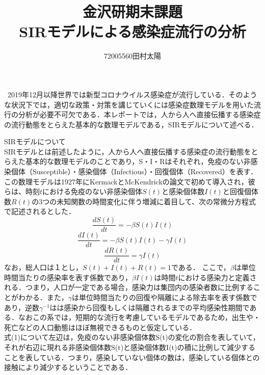\documentclass{jarticle}
\begin{document}
\title{金沢研期末課題\\SIRモデルによる感染症流行の分析}
\author{72005560田村太陽}
\maketitle

\begin{flushleft}\
2019年12月以降世界では新型コロナウイルス感染症が流行している．そのような状況下では，適切な政策・対策を講じていくには感染症数理モデルを用いた流行の分析が必要不可欠である．本レポートでは，人から人へ直接伝播する感染症の流行動態をとらえた基本的な数理モデルである，SIRモデルについて述べる．
\end{flushleft}


SIRモデルについて\\
SIRモデルとは前述したように，人から人へ直接伝播する感染症の流行動態をとらえた基本的な数理モデルのことであり，S・I・Rはそれぞれ，免疫のない非感染個体（Susceptible）・感染個体（Infectious）・回復個体（Recovered）を表す．この数理モデルは1927年にKermackとMcKendrickの論文で初めて導入され，彼らは、時刻$t$における免疫のない非感染個体$S(t)$と感染個体数$I(t)$と回復個体数$R(t)$の3つの未知関数の時間変化に伴う増減に着目して、次の常微分方程式で記述されるとした．\\
\begin{equation}
\frac{dS(t)}{dt} = -\beta S(t)I(t) 
\end{equation}
\begin{equation}
\frac{dI(t)}{dt} = -\beta S(t)I(t)-\gamma I(t)
\end{equation}
\begin{equation}
\frac{dR(t)}{dt} = \gamma I(t)
\end{equation}
なお，総人口は１とし，$S(t) + I(t) + R(t) = 1$である．
ここで，$\beta$は単位時間当たりの感染率を表す係数であり，$\beta I(t)$は時間$t$における感染力と定義される．つまり，人口が一定である場合，感染力は集団内の感染者数に比例することがわかる．また，$\gamma$は単位時間当たりの回復や隔離による除去率を表す係数であり，逆数$\gamma ^{-1}$はは感染から回復もしくは隔離されるまでの平均感染性期間である．なおこの系では，短期的な流行を考慮しているモデルであるため，出生や・死亡などの人口動態はほぼ無視できるものと仮定している．\\
式(1)について左辺は，免疫のない非感染個体数S(t)の変化の割合を表していて，それが右辺に現れる非感染個体数S(t)と感染個体数I(t)の積に比例して減少することを表している．つまり，感染していない個体の数は，感染している個体との接触により減少するということである．\\
\end{document}
